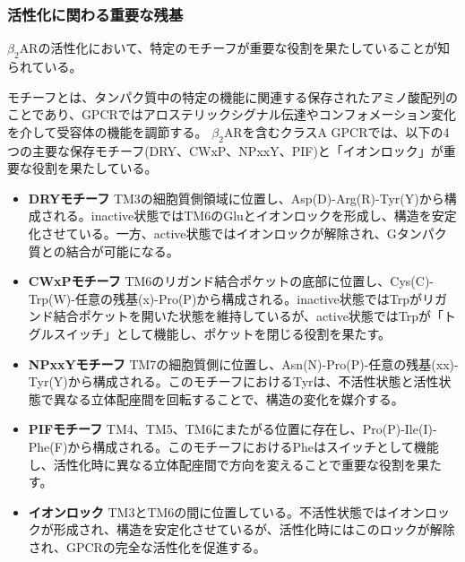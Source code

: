 \subsubsection{活性化に関わる重要な残基}
$\beta_2$ARの活性化において、特定のモチーフ\cite{nygaard2009ligand}\cite{lee2013mapping}が重要な役割を果たしていることが知られている。

モチーフとは、タンパク質中の特定の機能に関連する保存されたアミノ酸配列のことであり、GPCRではアロステリックシグナル伝達やコンフォメーション変化を介して受容体の機能を調節する。
$\beta_2$ARを含むクラスA GPCRでは、以下の4つの主要な保存モチーフ(DRY、CWxP、NPxxY、PIF)と「イオンロック」が重要な役割を果たしている。

\begin{itemize}
  \item \textbf{DRYモチーフ}  
  TM3の細胞質側領域に位置し、Asp(D)-Arg(R)-Tyr(Y)から構成される。inactive状態ではTM6のGluとイオンロックを形成し、構造を安定化させている。一方、active状態ではイオンロックが解除され、Gタンパク質との結合が可能になる。

  \item \textbf{CWxPモチーフ}  
  TM6のリガンド結合ポケットの底部に位置し、Cys(C)-Trp(W)-任意の残基(x)-Pro(P)から構成される。inactive状態ではTrpがリガンド結合ポケットを開いた状態を維持しているが、active状態ではTrpが「トグルスイッチ」として機能し、ポケットを閉じる役割を果たす。

  \item \textbf{NPxxYモチーフ}  
  TM7の細胞質側に位置し、Asn(N)-Pro(P)-任意の残基(xx)-Tyr(Y)から構成される。このモチーフにおけるTyrは、不活性状態と活性状態で異なる立体配座間を回転することで、構造の変化を媒介する。

  \item \textbf{PIFモチーフ}  
  TM4、TM5、TM6にまたがる位置に存在し、Pro(P)-Ile(I)-Phe(F)から構成される。このモチーフにおけるPheはスイッチとして機能し、活性化時に異なる立体配座間で方向を変えることで重要な役割を果たす。

  \item \textbf{イオンロック}  
  TM3とTM6の間に位置している。不活性状態ではイオンロックが形成され、構造を安定化させているが、活性化時にはこのロックが解除され、GPCRの完全な活性化を促進する。
\end{itemize}


